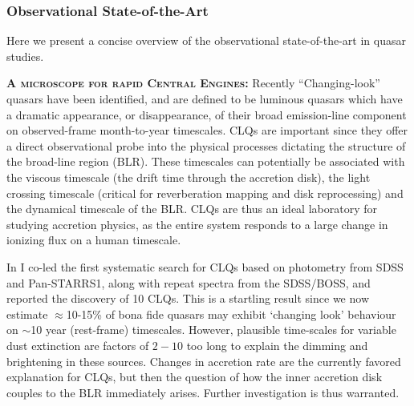 \subsubsection{Observational State-of-the-Art}
Here we present a concise overview of the observational state-of-the-art 
in quasar studies. 

\smallskip
\smallskip
\noindent
\textbf{\textsc{A microscope for rapid Central Engines:}}
Recently ``Changing-look'' quasars \citep[CLQs; ][]{LaMassa2015,
Runnoe2016, Ruan2016, Runco2016, MacLeod2016, Yang2017} have been
identified, and are defined to be luminous quasars which have a
dramatic appearance, or disappearance, of their broad emission-line
component on observed-frame month-to-year timescales.  CLQs are
important since they offer a direct observational probe into the
physical processes dictating the structure of the broad-line region
(BLR). These timescales can potentially be associated with the viscous
timescale (the drift time through the accretion disk), the light
crossing timescale (critical for reverberation mapping and disk
reprocessing) and the dynamical timescale of the BLR.  CLQs are thus
an ideal laboratory for studying accretion physics, as the entire
system responds to a large change in ionizing flux on a human
timescale.

\smallskip \smallskip
\noindent 
In \citet{MacLeod2016} I co-led the first systematic search for CLQs
based on photometry from SDSS and Pan-STARRS1, along with repeat
spectra from the SDSS/BOSS, and reported the discovery of 10
CLQs. This is a startling result since we now estimate
$\approx$10-15\% of bona fide quasars may exhibit `changing look'
behaviour on $\sim$10 year (rest-frame) timescales. However, plausible
time-scales for variable dust extinction are factors of $2-10$ too
long to explain the dimming and brightening in these sources.  Changes
in accretion rate are the currently favored explanation for CLQs, but
then the question of how the inner accretion disk couples to the BLR
immediately arises. Further investigation is thus warranted.

